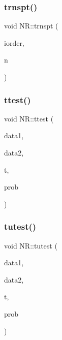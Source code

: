 \mbox{\label{namespaceNR_a36458f311bde4056fc362001e22b2570}} 
\subsubsection{\texorpdfstring{trnspt()}{trnspt()}}
{\footnotesize\ttfamily void N\+R\+::trnspt (\begin{DoxyParamCaption}\item[{\mbox{\hyperlink{namespaceNR_a3b8558419263875cc467f92b0ef4aba7}{Vec\+\_\+\+I\+O\+\_\+\+I\+NT}} \&}]{iorder,  }\item[{\mbox{\hyperlink{namespaceNR_ae67ce7dc86a8a64a7ce73c3c030ff610}{Vec\+\_\+\+I\+\_\+\+I\+NT}} \&}]{n }\end{DoxyParamCaption})}

\mbox{\label{namespaceNR_a586892538d6d03cea04d8c3fe1c6bb24}} 
\subsubsection{\texorpdfstring{ttest()}{ttest()}}
{\footnotesize\ttfamily void N\+R\+::ttest (\begin{DoxyParamCaption}\item[{\mbox{\hyperlink{namespaceNR_a9f943da53862537c552e2a770cb170ae}{Vec\+\_\+\+I\+\_\+\+DP}} \&}]{data1,  }\item[{\mbox{\hyperlink{namespaceNR_a9f943da53862537c552e2a770cb170ae}{Vec\+\_\+\+I\+\_\+\+DP}} \&}]{data2,  }\item[{\mbox{\hyperlink{namespaceNR_af6ff762dd605ff477b8e52387253a02a}{DP}} \&}]{t,  }\item[{\mbox{\hyperlink{namespaceNR_af6ff762dd605ff477b8e52387253a02a}{DP}} \&}]{prob }\end{DoxyParamCaption})}

\mbox{\label{namespaceNR_abd90c424ce9176090408d69f51affa4f}} 
\subsubsection{\texorpdfstring{tutest()}{tutest()}}
{\footnotesize\ttfamily void N\+R\+::tutest (\begin{DoxyParamCaption}\item[{\mbox{\hyperlink{namespaceNR_a9f943da53862537c552e2a770cb170ae}{Vec\+\_\+\+I\+\_\+\+DP}} \&}]{data1,  }\item[{\mbox{\hyperlink{namespaceNR_a9f943da53862537c552e2a770cb170ae}{Vec\+\_\+\+I\+\_\+\+DP}} \&}]{data2,  }\item[{\mbox{\hyperlink{namespaceNR_af6ff762dd605ff477b8e52387253a02a}{DP}} \&}]{t,  }\item[{\mbox{\hyperlink{namespaceNR_af6ff762dd605ff477b8e52387253a02a}{DP}} \&}]{prob }\end{DoxyParamCaption})}

